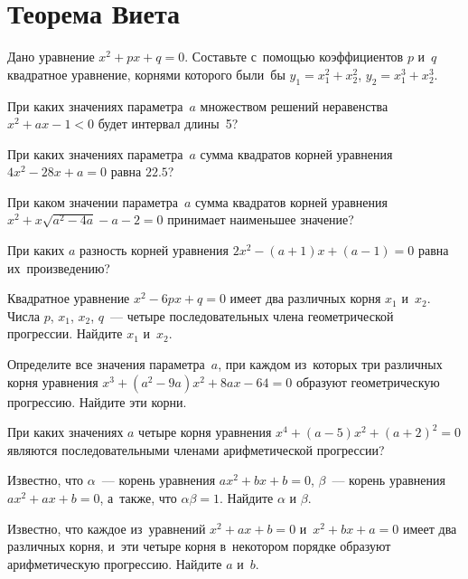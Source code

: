 
\section*{Теорема Виета}


\begingroup
    \def\ov{\overline}

\begin{problems}

\item
Дано уравнение $x^2 + p x + q = 0$.
Составьте с~помощью коэффициентов $p$ и~$q$ квадратное уравнение, корнями
которого были~бы $y_1 = x_1^2 + x_2^2$, $y_2 = x_1^3 + x_2^3$.

\item
При каких значениях параметра~$a$ множеством решений неравенства
$x^2 + a x - 1 < 0$ будет интервал длины~5?

\item
При каких значениях параметра~$a$ сумма квадратов корней уравнения
$4 x^2 - 28 x + a = 0$ равна $22.5$?

\item
При каком значении параметра~$a$ сумма квадратов корней уравнения
$x^2 + x \sqrt{a^2 - 4 a} - a - 2 = 0$ принимает наименьшее значение?

\item
При каких $a$ разность корней уравнения $2 x^2 - (a + 1) x + (a - 1) = 0$ равна
их~произведению?

\item
Квадратное уравнение $x^2 - 6 p x + q = 0$ имеет два различных корня $x_1$
и~$x_2$.
Числа $p$, $x_1$, $x_2$, $q$~--- четыре последовательных члена геометрической
прогрессии.
Найдите $x_1$ и~$x_2$.

\item
Определите все значения параметра~$a$, при каждом из~которых три различных
корня уравнения $x^3 + (a^2 - 9 a) x^2 + 8 a x - 64 = 0$ образуют
геометрическую прогрессию.
Найдите эти корни.

\item
При каких значениях $a$ четыре корня уравнения
$x^4 + (a - 5) x^2 + (a + 2)^2 = 0$ являются последовательными членами
арифметической прогрессии?

\item
Известно, что $\alpha$~--- корень уравнения $a x^2 + b x + b = 0$,
$\beta$~--- корень уравнения $a x^2 + a x + b = 0$, а~также, что
$\alpha \beta = 1$.
Найдите $\alpha$ и $\beta$.

\item
Известно, что каждое из~уравнений $x^2 + a x + b = 0$ и~$x^2 + b x + a = 0$
имеет два различных корня, и~эти четыре корня в~некотором порядке образуют
арифметическую прогрессию.
Найдите $a$ и~$b$.

\end{problems}

\endgroup %

